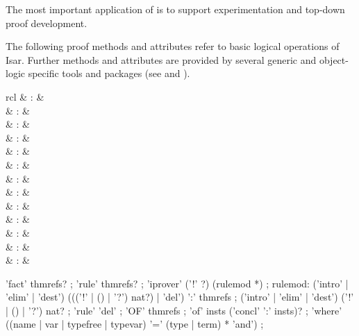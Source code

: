 \begin{isabellebody}
\begin{isamarkuptext}
\begin{descr}
  The most important application of \mbox{} is to support
  experimentation and top-down proof development.

  \end{descr}%
\end{isamarkuptext}%
\isamarkuptrue%
%
\isamarkuptrue%
%
\begin{isamarkuptext}%
The following proof methods and attributes refer to basic logical
  operations of Isar.  Further methods and attributes are provided by
  several generic and object-logic specific tools and packages (see
   and ).

  \begin{matharray}{rcl}
    \mbox{\isa{{\isacharminus}}} & : & \isarmeth \\
    \mbox{} & : & \isarmeth \\
    \mbox{} & : & \isarmeth \\
    \mbox{} & : & \isarmeth \\
    \mbox{} & : & \isarmeth \\
    \mbox{} & : & \isarmeth \\[0.5ex]
    \mbox{} & : & \isaratt \\
    \mbox{} & : & \isaratt \\
    \mbox{} & : & \isaratt \\
    \mbox{} & : & \isaratt \\[0.5ex]
    \mbox{} & : & \isaratt \\
    \mbox{} & : & \isaratt \\
    \mbox{} & : & \isaratt \\
  \end{matharray}

  \begin{rail}
    'fact' thmrefs?
    ;
    'rule' thmrefs?
    ;
    'iprover' ('!' ?) (rulemod *)
    ;
    rulemod: ('intro' | 'elim' | 'dest') ((('!' | () | '?') nat?) | 'del') ':' thmrefs
    ;
    ('intro' | 'elim' | 'dest') ('!' | () | '?') nat?
    ;
    'rule' 'del'
    ;
    'OF' thmrefs
    ;
    'of' insts ('concl' ':' insts)?
    ;
    'where' ((name | var | typefree | typevar) '=' (type | term) * 'and')
    ;
  \end{rail}


\end{isamarkuptext}
\end{isabellebody}
